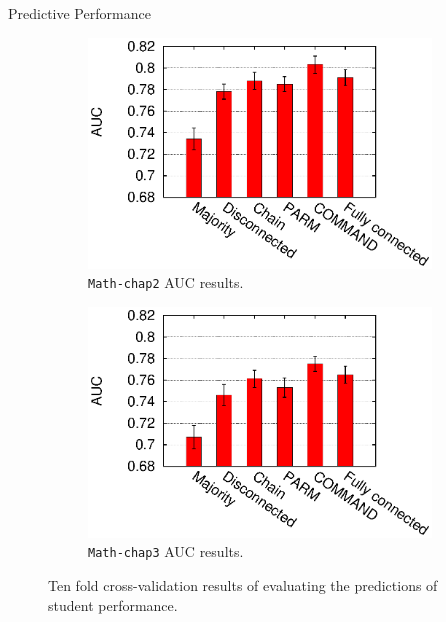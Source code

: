 \documentclass[hyperref={pdfpagelabels=false}]{beamer}
\begin{document}
\begin{frame}{Predictive Performance}
	\begin{figure}[!ht]
		\centering
		\begin{subfigure}[b]{0.48\linewidth}
			\centering
			\includegraphics[width=1.1\linewidth]{figures/hed_chap2_30_auc.eps}
			\caption{\texttt{Math-chap2} AUC results. }
			\label{fig:auc-chap2}
		\end{subfigure}
		\begin{subfigure}[b]{0.48\linewidth}
			\centering
			\includegraphics[width=1.1\linewidth]{figures/hed_chap3_33_auc.eps}
			\caption{\texttt{Math-chap3} AUC results.}
			\label{fig:auc-chap3}
		\end{subfigure}%
		\caption{\footnotesize Ten fold cross-validation results of evaluating the predictions of student performance.} %
		\label{fig:aucs}
	\end{figure} 
\end{frame}
\end{document}
